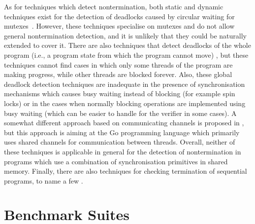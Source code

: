 As for techniques which detect nontermination, both static and dynamic
techniques exist for the detection of deadlocks caused by circular waiting for
mutexes~\cite{CC14,agarwal2010detection,bensalem2005scalable}.
However, these techniques specialise on mutexes and do not allow general nontermination detection, and it is unlikely that they could be naturally extended to cover it.
There are also techniques that detect deadlocks of the whole program (i.e., a program state from which the program cannot move) \cite{Chaki2005,Demartini99}, but these techniques cannot find cases in which only some threads of the program are making progress, while other threads are blocked forever.
Also, these global deadlock detection techniques are inadequate in the presence of synchronisation mechanisms which causes busy waiting instead of blocking (for example spin locks) or in the cases when normally blocking operations are implemented using busy waiting (which can be easier to handle for the verifier in some cases).
A somewhat different approach based on communicating channels is proposed in \cite{Ng2016}, but this approach is aiming at the Go programming language which primarily uses shared channels for communication between threads.
Overall, neither of these techniques is applicable in general for the detection of nontermination in programs which use a combination of synchronisation primitives in shared memory.
Finally, there are also techniques for checking termination of sequential programs, to name a few \cite{Giesl2017,Chen2018}.

\section{Benchmark Suites}

